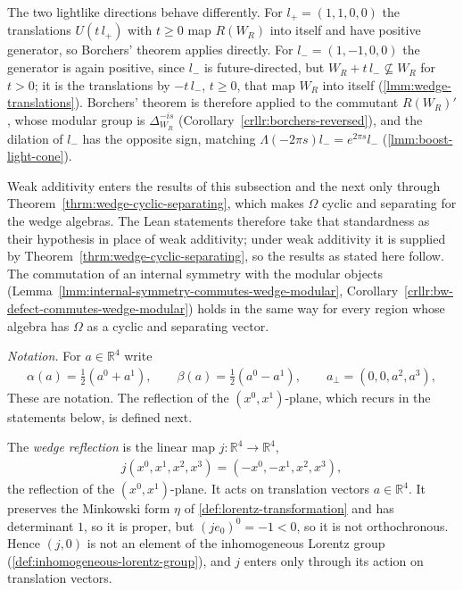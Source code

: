 The two lightlike directions behave differently. For $l_+ = (1, 1, 0, 0)$ the translations $U(t\,l_+)$ with $t \ge 0$ map $R(W_R)$ into itself and have positive generator, so Borchers' theorem applies directly. For $l_- = (1, -1, 0, 0)$ the generator is again positive, since $l_-$ is future-directed, but $W_R + t\,l_- \not\subseteq W_R$ for $t > 0$; it is the translations by $-t\,l_-$, $t \ge 0$, that map $W_R$ into itself (\ref{lmm:wedge-translations}). Borchers' theorem is therefore applied to the commutant $R(W_R)'$, whose modular group is $\Delta_{W_R}^{-is}$ (Corollary~\ref{crllr:borchers-reversed}), and the dilation of $l_-$ has the opposite sign, matching $\Lambda(-2\pi s)l_- = e^{2\pi s}l_-$ (\ref{lmm:boost-light-cone}).

Weak additivity enters the results of this subsection and the next only through Theorem~\ref{thrm:wedge-cyclic-separating}, which makes $\Omega$ cyclic and separating for the wedge algebras. The Lean statements therefore take that standardness as their hypothesis in place of weak additivity; under weak additivity it is supplied by Theorem~\ref{thrm:wedge-cyclic-separating}, so the results as stated here follow. The commutation of an internal symmetry with the modular objects (Lemma~\ref{lmm:internal-symmetry-commutes-wedge-modular}, Corollary~\ref{crllr:bw-defect-commutes-wedge-modular}) holds in the same way for every region whose algebra has $\Omega$ as a cyclic and separating vector.

\emph{Notation.} For $a \in \mathbb{R}^4$ write
\begin{align}
    \alpha(a) = \tfrac{1}{2}(a^0 + a^1), \qquad \beta(a) = \tfrac{1}{2}(a^0 - a^1), \qquad a_\perp = (0, 0, a^2, a^3),
\end{align}
These are notation. The reflection of the $(x^0, x^1)$-plane, which recurs in the statements below, is defined next.

\begin{definition}
    \label{def:wedge-reflection}
    \leanok
    The \emph{wedge reflection} is the linear map $j : \mathbb{R}^4 \to \mathbb{R}^4$,
    \begin{align}
        j(x^0, x^1, x^2, x^3) = (-x^0, -x^1, x^2, x^3),
    \end{align}
    the reflection of the $(x^0, x^1)$-plane. It acts on translation vectors $a \in \mathbb{R}^4$. It preserves the Minkowski form $\eta$ of \ref{def:lorentz-transformation} and has determinant $1$, so it is proper, but $(je_0)^0 = -1 < 0$, so it is not orthochronous. Hence $(j, 0)$ is not an element of the inhomogeneous Lorentz group (\ref{def:inhomogeneous-lorentz-group}), and $j$ enters only through its action on translation vectors.
\end{definition}

